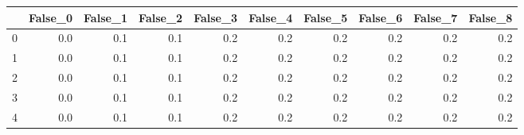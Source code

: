\begin{tabular}{lrrrrrrrrr}
\toprule
{} &  False\_0 &  False\_1 &  False\_2 &  False\_3 &  False\_4 &  False\_5 &  False\_6 &  False\_7 &  False\_8 \\ \hline
\midrule
0 &      0.0 &      0.1 &      0.1 &      0.2 &      0.2 &      0.2 &      0.2 &      0.2 &      0.2 \\ \hline
1 &      0.0 &      0.1 &      0.1 &      0.2 &      0.2 &      0.2 &      0.2 &      0.2 &      0.2 \\ \hline
2 &      0.0 &      0.1 &      0.1 &      0.2 &      0.2 &      0.2 &      0.2 &      0.2 &      0.2 \\ \hline
3 &      0.0 &      0.1 &      0.1 &      0.2 &      0.2 &      0.2 &      0.2 &      0.2 &      0.2 \\ \hline
4 &      0.0 &      0.1 &      0.1 &      0.2 &      0.2 &      0.2 &      0.2 &      0.2 &      0.2 \\ \hline
\bottomrule
\end{tabular}
